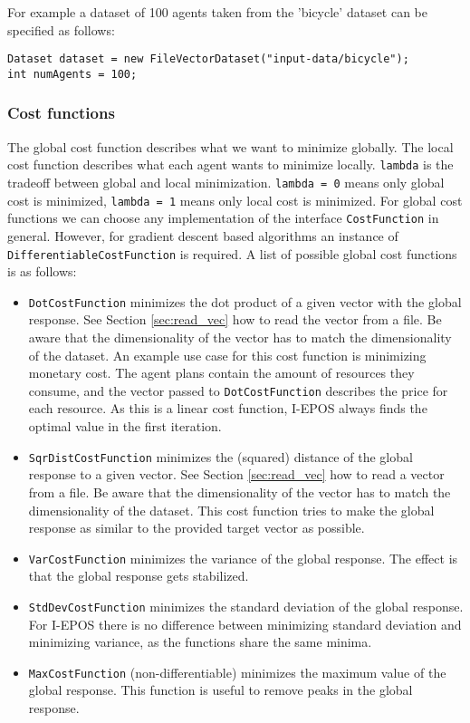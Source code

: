 \documentclass[11pt]{article} %
\newcommand{\code}{\texttt}
\begin{document}
For example a dataset of 100 agents taken from the 'bicycle' dataset can be specified as follows:
\begin{verbatim}
Dataset dataset = new FileVectorDataset("input-data/bicycle");
int numAgents = 100;
\end{verbatim}

\subsubsection*{Cost functions}
The global cost function describes what we want to minimize globally. The local cost function describes what each agent wants to minimize locally. \code{lambda} is the tradeoff between global and local minimization. \code{lambda = 0} means only global cost is minimized, \code{lambda = 1} means only local cost is minimized.
For global cost functions we can choose any implementation of the interface \code{CostFunction} in general. However, for gradient descent based algorithms an instance of \code{DifferentiableCostFunction} is required. A list of possible global cost functions is as follows:
\begin{itemize}
	\item \code{DotCostFunction} minimizes the dot product of a given vector with the global response. See Section \ref{sec:read_vec} how to read the vector from a file. Be aware that the dimensionality of the vector has to match the dimensionality of the dataset.
An example use case for this cost function is minimizing monetary cost. The agent plans contain the amount of resources they consume, and the vector passed to \code{DotCostFunction} describes the price for each resource.
As this is a linear cost function, I-EPOS always finds the optimal value in the first iteration.
	\item \code{SqrDistCostFunction} minimizes the (squared) distance of the global response to a given vector. See Section \ref{sec:read_vec} how to read a vector from a file. Be aware that the dimensionality of the vector has to match the dimensionality of the dataset.
This cost function tries to make the global response as similar to the provided target vector as possible.
	\item \code{VarCostFunction} minimizes the variance of the global response. The effect is that the global response gets stabilized.
	\item \code{StdDevCostFunction} minimizes the standard deviation of the global response. For I-EPOS there is no difference between minimizing standard deviation and minimizing variance, as the functions share the same minima.
	\item \code{MaxCostFunction} (non-differentiable) minimizes the maximum value of the global response. This function is useful to remove peaks in the global response.
\end{itemize}
\end{document}
